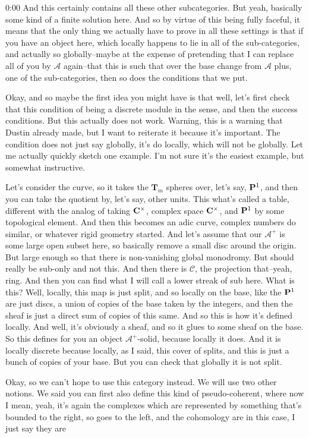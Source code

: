 \begin{unfinished}{0:00}
And this certainly contains all these other subcategories. But yeah, basically some kind of a finite solution here. And so by virtue of this being fully faceful, it means that the only thing we actually have to prove in all these settings is that if you have an object here, which locally happens to lie in all of the sub-categories, and actually so globally--maybe at the expense of pretending that I can replace all of you by $\mathcal{A}$ again--that this is such that over the base change from $\mathcal{A}$ plus, one of the sub-categories, then so does the conditions that we put.

Okay, and so maybe the first idea you might have is that well, let's first check that this condition of being a discrete module in the sense, and then the success conditions. But this actually does not work. Warning, this is a warning that Dustin already made, but I want to reiterate it because it's important. The condition does not just say globally, it's do locally, which will not be globally. Let me actually quickly sketch one example. I'm not sure it's the easiest example, but somewhat instructive.

Let's consider the curve, so it takes the $\mathbf{T}_m$ spheres over, let's say, $\P^1$, and then you can take the quotient by, let's say, other units. This what's called a table, different with the analog of taking $\C^\times$, complex space $\C^\times$, and $\P^1$ by some topological element. And then this becomes an adic curve, complex numbers do similar, or whatever rigid geometry started. And let's assume that our $\mathcal{A}^+$ is some large open subset here, so basically remove a small disc around the origin. But large enough so that there is non-vanishing global monodromy. But should really be sub-only and not this. And then there is $\mathcal{C}$, the projection that--yeah, ring. And then you can find what I will call a lower streak of sub here. What is this? Well, locally, this map is just split, and so locally on the base, like the $\P^1$ are just discs, a union of copies of the base taken by the integers, and then the sheaf is just a direct sum of copies of this same. And so this is how it's defined locally. And well, it's obviously a sheaf, and so it glues to some sheaf on the base. So this defines for you an object $\mathcal{A}^+$-solid, because locally it does. And it is locally discrete because locally, as I said, this cover of splits, and this is just a bunch of copies of your base. But you can check that globally it is not split.

Okay, so we can't hope to use this category instead. We will use two other notions. We said you can first also define this kind of pseudo-coherent, where now I mean, yeah, it's again the complexes which are represented by something that's bounded to the right, so goes to the left, and the cohomology are in this case, I just say they are


\end{unfinished}
